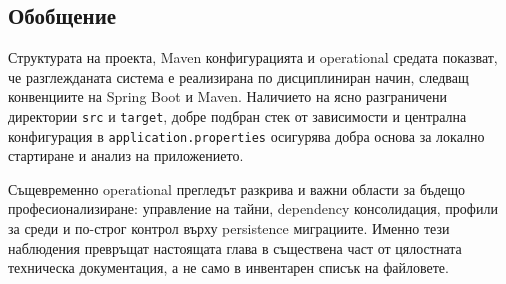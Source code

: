 \subsection{Обобщение}

Структурата на проекта, Maven конфигурацията и operational средата показват, че разглежданата система е реализирана по дисциплиниран начин, следващ конвенциите на Spring Boot и Maven. Наличието на ясно разграничени директории \texttt{src} и \texttt{target}, добре подбран стек от зависимости и централна конфигурация в \texttt{application.properties} осигурява добра основа за локално стартиране и анализ на приложението.

Същевременно operational прегледът разкрива и важни области за бъдещо професионализиране: управление на тайни, dependency консолидация, профили за среди и по-строг контрол върху persistence миграциите. Именно тези наблюдения превръщат настоящата глава в съществена част от цялостната техническа документация, а не само в инвентарен списък на файловете.
